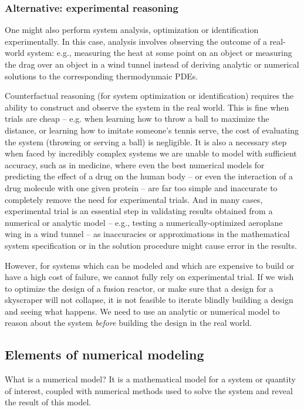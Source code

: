 \documentclass{puthesis}
\begin{document}
\subsubsection{Alternative: experimental reasoning}
One might also perform system analysis, optimization or identification experimentally.
In this case, analysis involves observing the outcome of a real-world system:
e.g., measuring the heat at some point on an object or measuring the drag over an
object in a wind tunnel instead of deriving analytic or numerical solutions to the
corresponding thermodynmaic PDEs.

Counterfactual reasoning (for system optimization or identification) requires the
ability to construct and observe the system in the real world.
This is fine when trials are cheap -- e.g. when learning how to throw a ball to
maximize the distance, or learning how to imitate someone's tennis serve, the
cost of evaluating the system (throwing or serving a ball) is negligible.
It is also a necessary step when faced by incredibly complex systems we are unable to model
with sufficient accuracy, such as in medicine, where even the best numerical models
for predicting the effect of a drug on the human body -- or even the interaction of
a drug molecule with one given protein -- are far too simple and inaccurate
to completely remove the need for experimental trials.
And in many cases, experimental trial is an essential step in validating results
obtained from a numerical or analytic model -- e.g., testing a numerically-optimized aeroplane wing in a wind tunnel -- as inaccuracies or approximations in the
mathematical system specification or in the solution procedure might cause error in
the results.

However, for systems which can be modeled and which are expensive to build or have a
high cost of failure, we cannot fully rely on experimental trial.
If we wish to optimize the design of a fusion reactor,
or make sure that a design for a skyscraper will not collapse, it is not feasible to
iterate blindly building a design and seeing what happens.
We need to use an analytic or numerical model to reason about the system
\emph{before} building the design in the real world.


\subsection{Elements of numerical modeling}
What is a numerical model? It is a mathematical model for a system or quantity of
interest, coupled with numerical methods used to solve the system and reveal the result
of this model.
\end{document}
